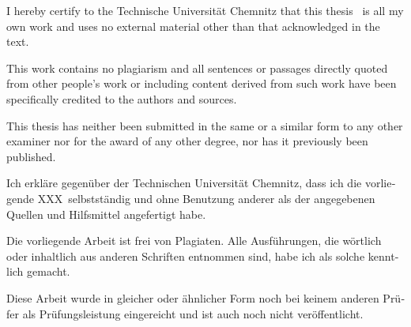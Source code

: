 %
%

\begin{tucerklaerung}
I hereby certify to the Technische Universität Chemnitz that this thesis%
\ is all my own work and uses no external material
other than that acknowledged in the text.

This work contains no plagiarism and all sentences or passages directly
quoted from other people's work or including content derived from such work
have been specifically credited to the authors and sources.

This thesis has neither been submitted in the same or a similar form to any
other examiner nor for the award of any other degree, nor has it previously
been published.

\end{tucerklaerung}


%
%

\begin{otherlanguage}{ngerman}
\begin{tucerklaerung}
Ich erkläre gegenüber der Technischen Universität Chemnitz, dass ich die
vorliegende XXX\ selbstständig und ohne Benutzung anderer
als der angegebenen Quellen und Hilfsmittel angefertigt habe.

Die vorliegende Arbeit ist frei von Plagiaten. Alle Ausführungen, die wörtlich
oder inhaltlich aus anderen Schriften entnommen sind, habe ich als solche
kenntlich gemacht.

Diese Arbeit wurde in gleicher oder ähnlicher Form noch bei keinem anderen
Prüfer als Prüfungsleistung eingereicht und ist auch noch nicht veröffentlicht.

\end{tucerklaerung}
\end{otherlanguage}
